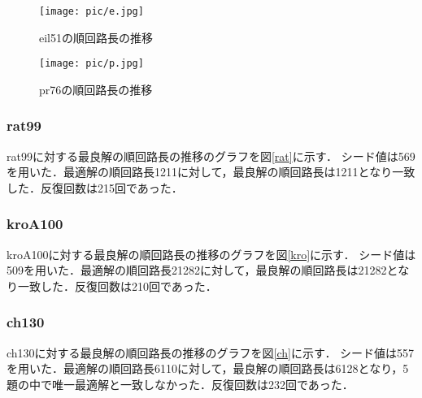 \documentclass[a4j]{jsarticle}
\begin{document}
\begin{figure}[H]
 \begin{center}
 \end{center}
\end{figure}

\begin{figure}[htb]
 \begin{minipage}{0.5\hsize}
  \begin{center}
  \texttt{[image: pic/e.jpg]}
  \end{center}
  \caption{eil51の順回路長の推移}
  \label{eil}
 \end{minipage}
 \begin{minipage}{0.5\hsize}
  \begin{center}
  \texttt{[image: pic/p.jpg]}
  \end{center}
  \caption{pr76の順回路長の推移}
  \label{pr}
 \end{minipage}
\end{figure}



\subsubsection{rat99}
rat99に対する最良解の順回路長の推移のグラフを図\ref{rat}に示す．
シード値は569を用いた．最適解の順回路長1211に対して，最良解の順回路長は1211となり一致した．反復回数は215回であった．
\subsubsection{kroA100}
kroA100に対する最良解の順回路長の推移のグラフを図\ref{kro}に示す．
シード値は509を用いた．最適解の順回路長21282に対して，最良解の順回路長は21282となり一致した．反復回数は210回であった．
\subsubsection{ch130}
ch130に対する最良解の順回路長の推移のグラフを図\ref{ch}に示す．
シード値は557を用いた．最適解の順回路長6110に対して，最良解の順回路長は6128となり，5題の中で唯一最適解と一致しなかった．反復回数は232回であった．
\end{document}
